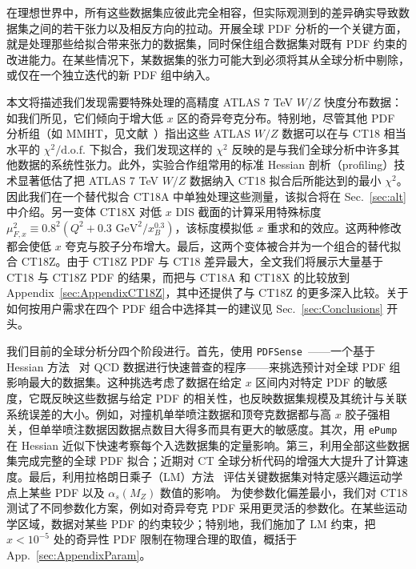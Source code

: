 在理想世界中，所有这些数据集应彼此完全相容，但实际观测到的差异确实导致数据集之间的若干张力以及相反方向的拉动。开展全球 PDF 分析的一个关键方面，就是处理那些给拟合带来张力的数据集，同时保住组合数据集对既有 PDF 约束的改进能力。在某些情况下，某数据集的张力可能大到必须将其从全球分析中剔除，或仅在一个独立迭代的新 PDF 组中纳入。

本文将描述我们发现需要特殊处理的高精度 ATLAS 7 TeV $W/Z$ 快度分布数据：如我们所见，它们倾向于增大低 $x$ 区的奇异夸克分布。特别地，尽管其他 PDF 分析组（如 MMHT，见文献~\cite{Thorne:2019mpt}）指出这些 ATLAS $W/Z$ 数据可以在与 CT18 相当水平的 $\chi^2/\mathrm{d.o.f.}$ 下拟合，我们发现这样的 $\chi^2$ 反映的是与我们全球分析中许多其他数据的系统性张力。此外，实验合作组常用的标准 Hessian 剖析（profiling）技术显著低估了把 ATLAS 7 TeV $W/Z$ 数据纳入 CT18 拟合后所能达到的最小 $\chi^2$。因此我们在一个替代拟合 CT18A 中单独处理这些测量，该拟合将在 Sec.~\ref{sec:alt} 中介绍。另一变体 CT18X 对低 $x$ DIS 截面的计算采用特殊标度 $\mu^2_{F,x} \equiv 0.8^2 \left(Q^2 + 0.3\mbox{ GeV}^2/x_B^{0.3}\right)$，该标度模拟低 $x$ 重求和的效应。这两种修改都会使低 $x$ 夸克与胶子分布增大。最后，这两个变体被合并为一个组合的替代拟合 CT18Z。由于 CT18Z PDF 与 CT18 差异最大，全文我们将展示大量基于 CT18 与 CT18Z PDF 的结果，而把与 CT18A 和 CT18X 的比较放到 Appendix~\ref{sec:AppendixCT18Z}，其中还提供了与 CT18Z 的更多深入比较。关于如何按用户需求在四个 PDF 组合中选择其一的建议见 Sec.~\ref{sec:Conclusions} 开头。

我们目前的全球分析分四个阶段进行。首先，使用 \texttt{PDFSense}~\cite{Wang:2018heo,Hobbs:2019gob}——一个基于 Hessian 方法~\cite{Pumplin:2001ct,Pumplin:2002vw} 对 QCD 数据进行快速普查的程序——来挑选预计对全球 PDF 组影响最大的数据集。这种挑选考虑了数据在给定 $x$ 区间内对特定 PDF 的敏感度，它既反映这些数据与给定 PDF 的相关性，也反映数据集规模及其统计与关联系统误差的大小。例如，对撞机单举喷注数据和顶夸克数据都与高 $x$ 胶子强相关，但单举喷注数据因数据点数目大得多而具有更大的敏感度。其次，用 \texttt{ePump}~\cite{Schmidt:2018hvu,Hou:2019gfw} 在 Hessian 近似下快速考察每个入选数据集的定量影响。第三，利用全部这些数据集完成完整的全球 PDF 拟合；近期对 CT 全球分析代码的增强大大提升了计算速度。最后，利用拉格朗日乘子（LM）方法~\cite{Stump:2001gu} 评估关键数据集对特定感兴趣运动学点上某些 PDF 以及 $\alpha_s(M_Z)$ 数值的影响。
为使参数化偏差最小，我们对 CT18 测试了不同参数化方案，例如对奇异夸克 PDF 采用更灵活的参数化。在某些运动学区域，数据对某些 PDF 的约束较少；特别地，我们施加了 LM 约束，把 $x < 10^{-5}$ 处的奇异性 PDF 限制在物理合理的取值，概括于 App.~\ref{sec:AppendixParam}。

